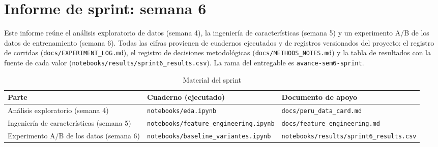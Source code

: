 
\chapter{Informe de sprint: semana 6}

Este informe reúne el análisis exploratorio de datos (semana 4), la ingeniería de características
(semana 5) y un experimento A/B de los datos de entrenamiento (semana 6). Todas las cifras provienen
de cuadernos ejecutados y de registros versionados del proyecto: el registro de corridas
(\texttt{docs/\allowbreak{}EXPERIMENT\_\allowbreak{}LOG.md}), el registro de decisiones metodológicas
(\texttt{docs/\allowbreak{}METHODS\_\allowbreak{}NOTES.md}) y la tabla de resultados con la fuente de cada valor
(\texttt{notebooks/\allowbreak{}results/\allowbreak{}sprint6\_\allowbreak{}results.csv}). La rama del entregable es
\texttt{avance-\allowbreak{}sem6-\allowbreak{}sprint}.

\begin{table}[H]
    \centering
    \small
    \caption{Material del sprint}
    \label{tab:sprint_material}
    \begin{tabular}{|p{4.2cm}|p{5.0cm}|p{5.0cm}|}
        \hline
        \textbf{Parte} & \textbf{Cuaderno (ejecutado)} & \textbf{Documento de apoyo} \\
        \hline
        Análisis exploratorio (semana 4) & \texttt{notebooks/\allowbreak{}eda.ipynb} & \texttt{docs/\allowbreak{}peru\_\allowbreak{}data\_\allowbreak{}card.md} \\
        \hline
        Ingeniería de características (semana 5) & \texttt{notebooks/\allowbreak{}feature\_\allowbreak{}engineering.ipynb} & \texttt{docs/\allowbreak{}feature\_\allowbreak{}engineering.md} \\
        \hline
        Experimento A/B de los datos (semana 6) & \texttt{notebooks/\allowbreak{}baseline\_\allowbreak{}variantes.ipynb} & \texttt{notebooks/\allowbreak{}results/\allowbreak{}sprint6\_\allowbreak{}results.csv} \\
        \hline
    \end{tabular}
\end{table}

